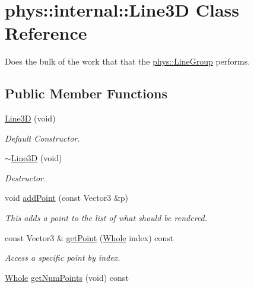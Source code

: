 \hypertarget{classphys_1_1internal_1_1Line3D}{
\section{phys::internal::Line3D Class Reference}
\label{d4/db5/classphys_1_1internal_1_1Line3D}
}


Does the bulk of the work that that the \hyperlink{classphys_1_1LineGroup}{phys::LineGroup} performs.  


\subsection*{Public Member Functions}
\begin{DoxyCompactItemize}
\item 
\hyperlink{classphys_1_1internal_1_1Line3D_ab22b8f5fae0bb2585b1031adfff424bd}{Line3D} (void)
\begin{DoxyCompactList}\small\item\em Default Constructor. \item\end{DoxyCompactList}\item 
\hyperlink{classphys_1_1internal_1_1Line3D_acddc95dd5f319d6afc68260af8bea39c}{$\sim$Line3D} (void)
\begin{DoxyCompactList}\small\item\em Destructor. \item\end{DoxyCompactList}\item 
void \hyperlink{classphys_1_1internal_1_1Line3D_aeb3b828b35b4c8ed76158285be6ddc67}{addPoint} (const Vector3 \&p)
\begin{DoxyCompactList}\small\item\em This adds a point to the list of what should be rendered. \item\end{DoxyCompactList}\item 
const Vector3 \& \hyperlink{classphys_1_1internal_1_1Line3D_a190af0e38be28297ed2f6a7aecf0c316}{getPoint} (\hyperlink{namespacephys_a460f6bc24c8dd347b05e0366ae34f34a}{Whole} index) const 
\begin{DoxyCompactList}\small\item\em Access a specific point by index. \item\end{DoxyCompactList}\item 
\hyperlink{namespacephys_a460f6bc24c8dd347b05e0366ae34f34a}{Whole} \hyperlink{classphys_1_1internal_1_1Line3D_ab72a9dab3a355035c24c15e4a737ea2f}{getNumPoints} (void) const 

\end{DoxyCompactItemize}
